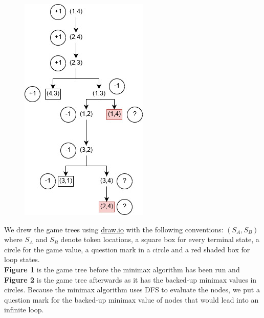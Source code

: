 \documentclass{article}
\begin{document}
\begin{figure}[H]
\begin{minipage}{.45\linewidth}
  \includegraphics[width=\linewidth]{images/q10_2.jpg}
  \label{img2}
\end{minipage}
\end{figure}

We drew the game trees using \href{https://www.draw.io}{draw.io} with the following conventions: $(S_A, S_B)$ where $S_A$ and $S_B$ denote token locations, a square box for every terminal state, a circle for the game value, a question mark in a circle and a red shaded box for loop states.
\\
\textbf{Figure 1} is the game tree before the minimax algorithm has been run and \textbf{Figure 2} is the game tree afterwards as it has the backed-up minimax values in circles. Because the minimax algorithm uses DFS to evaluate the nodes, we put a question mark for the backed-up minimax value of nodes that would lead into an infinite loop.
\end{document}
